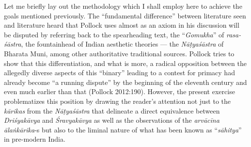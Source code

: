 Let me briefly lay out the methodology which I shall employ here to achieve the goals mentioned previously. The “fundamental difference” between literature seen and literature heard that Pollock uses almost as an axiom in his discussion will be disputed by referring back to the spearheading text, the “\textsl{Gomukha}” of \textsl{rasa-śāstra}, the fountainhead of Indian aesthetic theories --- the \textsl{Nāṭyaśāstra} of Bharata Muni, among other authoritative traditional sources. Pollock tries to show that this differentiation, and what is more, a radical opposition between the allegedly diverse aspects of this “binary” leading to a contest for primacy had already become “a running dispute” by the beginning of the eleventh century and even much earlier than that (Pollock 2012:190). However, the present exercise problematizes this position by drawing the reader’s attention not just to the \textsl{kārikas} from the \textsl{Nāṭyaśāstra} that delineate a direct equivalence between \textsl{Driśyakāvya} and \textsl{Śravyakāvya} as well as the observations of the \textsl{arvācīna ālaṅkārika}-s but also to the liminal nature of what has been known as “\textsl{sāhitya}” in pre-modern India. 

